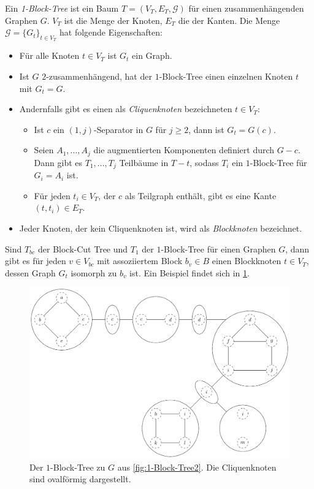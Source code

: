 \begin{definition}
  Ein \emph{1-Block-Tree} ist ein Baum $T = (V_T, E_T, \mathcal{G})$ für einen zusammenhängenden Graphen $G$.
  $V_T$ ist die Menge der Knoten, $E_T$ die der Kanten.
  Die Menge $\mathcal{G} = \{G_t\}_{t \in V_T}$ hat folgende Eigenschaften:
  \begin{itemize}
    \item Für alle Knoten $t \in V_T$ ist $G_t$ ein Graph.
    \item Ist $G$ $2$-zusammenhängend, hat der $1$-Block-Tree einen einzelnen Knoten $t$ mit $G_t = G$.
    \item Andernfalls gibt es einen als \emph{Cliquenknoten} bezeichneten $t \in V_T$:
    \begin{itemize}
      \item Ist $c$ ein $(1, j)$-Separator in $G$ für $j \geq 2$, dann ist $G_t = G(c)$.
      \item Seien $A_1, ..., A_j$ die augmentierten Komponenten definiert durch $G - c$.
            Dann gibt es $T_1, ..., T_j$ Teilbäume in $T - t$, sodass $T_i$ ein $1$-Block-Tree für $G_i = A_i$ ist.
      \item Für jeden $t_i \in V_T$, der $c$ als Teilgraph enthält, gibt es eine Kante $(t, t_i) \in E_T$.
    \end{itemize}
    \item Jeder Knoten, der kein Cliquenknoten ist, wird als \emph{Blockknoten} bezeichnet.
  \end{itemize}
\end{definition}
Sind $T_{bc}$ der Block-Cut Tree und $T_1$ der $1$-Block-Tree für einen Graphen $G$, dann gibt es für jeden $v \in V_{bc}$ mit assoziiertem Block $b_v \in B$ einen Blockknoten $t \in V_T$, dessen Graph $G_t$ isomorph zu $b_v$ ist.
Ein Beispiel findet sich in \Abb \ref{fig:1-Block-Tree3}.
\begin{figure}[H]
  \centering
  \includegraphics[width=\textwidth,height=\textheight,keepaspectratio]{bilder/1-Block-Tree3.pdf}
  \caption{Der $1$-Block-Tree zu $G$ aus \Abb \ref{fig:1-Block-Tree2}.
           Die Cliquenknoten sind ovalförmig dargestellt.}
  \label{fig:1-Block-Tree3}
\end{figure}



